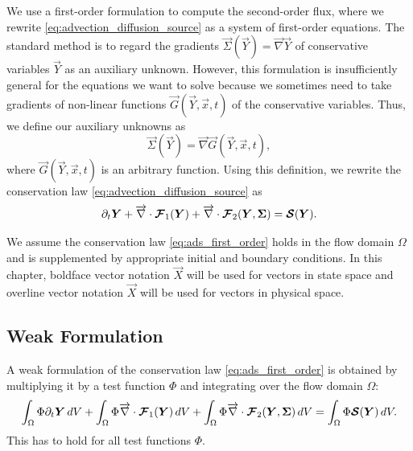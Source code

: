 \documentclass{report}
\numberwithin{equation}{section}
\begin{document}
 We use a first-order formulation to compute the second-order flux, where we rewrite \eqref{eq:advection_diffusion_source} as a system of first-order equations. The standard method is to regard the gradients $\vec \Sigma (\vec Y) = \overrightarrow{\nabla} \vec Y$ of conservative variables $\vec{Y}$ as an auxiliary unknown. However, this formulation is insufficiently general for the equations we want to solve because we sometimes need to take gradients of non-linear functions $\vec{G}(\vec Y, \overrightarrow{x}, t)$ of the conservative variables. Thus, we define our auxiliary unknowns as
\begin{equation}
    \vec \Sigma (\vec Y) = \overrightarrow{\nabla} \vec G (\vec Y, \overrightarrow{x}, t),
    \label{eq:auxiliary}
\end{equation}
where $\vec G(\vec Y, \overrightarrow{x}, t)$ is an arbitrary function. Using this definition, we rewrite the conservation law \eqref{eq:advection_diffusion_source} as
\begin{align}
    \partial_t \boldsymbol{{Y}} 
    + \overrightarrow{\nabla} \cdot \boldsymbol{{\mathcal{F}}}_1 (\boldsymbol{{Y}}) 
    + \overrightarrow{\nabla} \cdot \boldsymbol{{\mathcal{F}}}_2 (\boldsymbol{{Y}}, \boldsymbol{{\Sigma}}) 
    = \boldsymbol{{\mathcal{S}}}(\boldsymbol{{Y}}).
    \label{eq:ads_first_order}
\end{align}

We assume the conservation law \eqref{eq:ads_first_order} holds in the flow domain $\Omega$ and is supplemented by appropriate initial and boundary conditions. In this chapter, boldface vector notation $\vec X$ will be used for vectors in state space and overline vector notation $\overrightarrow{X}$ will be used for vectors in physical space. 

\subsection{Weak Formulation}

A weak formulation of the conservation law \eqref{eq:ads_first_order} is obtained by multiplying it by a test function $\Phi$ and integrating over the flow domain $\Omega$:
\begin{equation}
    \int_\Omega \Phi \partial_t \boldsymbol{{Y}} \, dV
    + \int_\Omega \Phi \overrightarrow{\nabla} \cdot \boldsymbol{{\mathcal{F}}}_1(\boldsymbol{{Y}}) \, dV 
    + \int_\Omega \Phi \overrightarrow{\nabla} \cdot \boldsymbol{{\mathcal{F}}}_2(\boldsymbol{{Y}}, \boldsymbol{{\Sigma}}) \, dV
    = \int_\Omega \Phi \boldsymbol{{\mathcal{S}}}(\boldsymbol{{Y}}) \, dV.
\end{equation}
 This has to hold for all test functions $\Phi$. 
 
\end{document}
